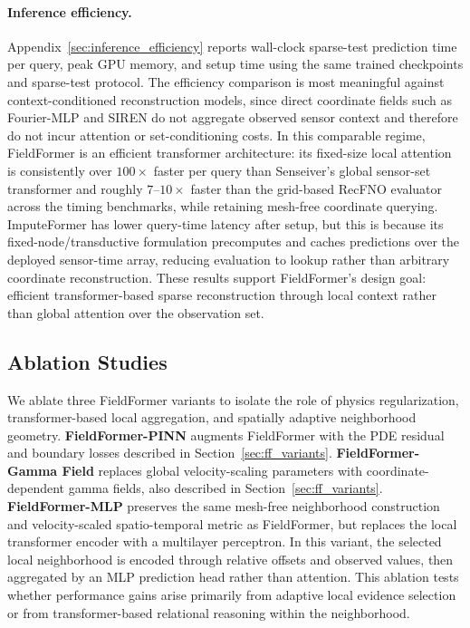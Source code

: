 \paragraph{Inference efficiency.}
Appendix~\ref{sec:inference_efficiency} reports wall-clock sparse-test prediction time per query, peak GPU memory, and setup time using the same trained checkpoints and sparse-test protocol. The efficiency comparison is most meaningful against context-conditioned reconstruction models, since direct coordinate fields such as Fourier-MLP and SIREN do not aggregate observed sensor context and therefore do not incur attention or set-conditioning costs. In this comparable regime, FieldFormer is an efficient transformer architecture: its fixed-size local attention is consistently over $100\times$ faster per query than Senseiver's global sensor-set transformer and roughly $7$--$10\times$ faster than the grid-based RecFNO evaluator across the timing benchmarks, while retaining mesh-free coordinate querying. ImputeFormer has lower query-time latency after setup, but this is because its fixed-node/transductive formulation precomputes and caches predictions over the deployed sensor-time array, reducing evaluation to lookup rather than arbitrary coordinate reconstruction. These results support FieldFormer's design goal: efficient transformer-based sparse reconstruction through local context rather than global attention over the observation set.

\subsection{Ablation Studies}
\label{sec:ablations}

We ablate three FieldFormer variants to isolate the role of physics regularization, transformer-based local aggregation, and spatially adaptive neighborhood geometry. \textbf{FieldFormer-PINN} augments FieldFormer with the PDE residual and boundary losses described in Section~\ref{sec:ff_variants}. \textbf{FieldFormer-Gamma Field} replaces global velocity-scaling parameters with coordinate-dependent gamma fields, also described in Section~\ref{sec:ff_variants}. \textbf{FieldFormer-MLP} preserves the same mesh-free neighborhood construction and velocity-scaled spatio-temporal metric as FieldFormer, but replaces the local transformer encoder with a multilayer perceptron. In this variant, the selected local neighborhood is encoded through relative offsets and observed values, then aggregated by an MLP prediction head rather than attention. This ablation tests whether performance gains arise primarily from adaptive local evidence selection or from transformer-based relational reasoning within the neighborhood.

